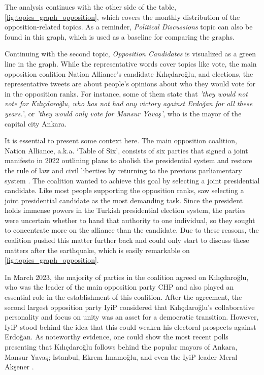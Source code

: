 The analysis continues with the other side of the table, \autoref{fig:topics_graph_opposition}, 
which covers the monthly distribution of the opposition-related topics. As a reminder, 
\textit{Political Discussions} topic can also be found in this graph, which is used as a baseline 
for comparing the graphs.

Continuing with the second topic, \textit{Opposition Candidates} is visualized as a green line in the 
graph. While the representative words cover topics like vote, the main opposition coalition 
Nation Alliance's candidate Kılıçdaroğlu, and elections, the representative tweets are about 
people's opinions about who they would vote for in the opposition ranks. For instance, some of 
them state that \textit{'they would not vote for Kılıçdaroğlu, who has not had any victory 
against Erdoğan for all these years.'}, or  \textit{'they would only vote for Mansur Yavaş'}, 
who is the mayor of the capital city Ankara. 

It is essential to present some context here. The main opposition coalition, Nation Alliance, 
a.k.a. `Table of Six', consists of six parties that signed a joint manifesto in 2022 outlining 
plans to abolish the presidential system and restore the rule of law and civil liberties by 
returning to the previous parliamentary system \parencite{berk_esen_opposition_alliance_2023}. 
The coalition wanted to achieve this goal by selecting a joint presidential candidate. 
Like most people supporting the opposition ranks, \textcite{berk_esen_opposition_alliance_2023} saw 
selecting a joint presidential candidate as the most demanding task. 
Since the president holds immense powers in the Turkish presidential election system, the parties 
were uncertain whether to hand that authority to one individual, so they sought to concentrate 
more on the alliance than the candidate. Due to these reasons, the coalition pushed this matter 
further back and could only start to discuss these matters after the earthquake, which is easily 
remarkable on \autoref{fig:topics_graph_opposition}. 

In March 2023, the majority of parties in the coalition agreed on Kılıçdaroğlu, 
who was the leader of the main opposition party \ac{CHP} and also played an essential role in 
the establishment of this coalition. 
After the agreement, the second largest opposition party \ac{IyiP} considered that 
Kılıçdaroğlu's collaborative personality and focus on unity was an asset for a democratic 
transition. However, \ac{IyiP} stood behind the idea that this could weaken his electoral prospects against 
Erdo­ğan. As noteworthy evidence, one could show the most recent polls presenting that Kılıçdaroğlu 
follows behind the popular mayors of Ankara, Mansur Yavaş; Istanbul, Ekrem Imamoğlu, and even the 
\ac{IyiP} leader Meral Akşener \parencite{berk_esen_opposition_alliance_2023}.

